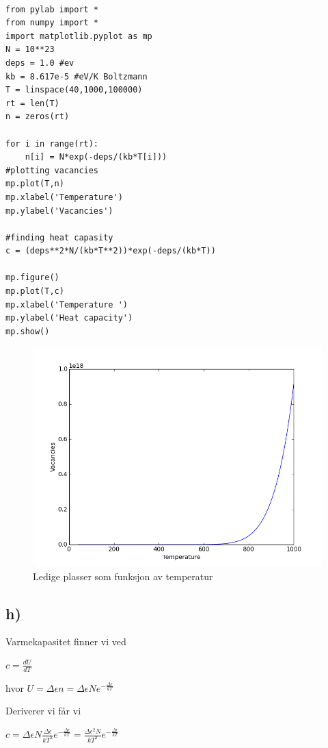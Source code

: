 \documentclass[12pt]{article}
\begin{document}
\begin{lstlisting}

from pylab import *
from numpy import *
import matplotlib.pyplot as mp
N = 10**23
deps = 1.0 #ev
kb = 8.617e-5 #eV/K Boltzmann
T = linspace(40,1000,100000)
rt = len(T)
n = zeros(rt)

for i in range(rt):
    n[i] = N*exp(-deps/(kb*T[i]))
#plotting vacancies 
mp.plot(T,n)
mp.xlabel('Temperature')
mp.ylabel('Vacancies')

#finding heat capasity
c = (deps**2*N/(kb*T**2))*exp(-deps/(kb*T))

mp.figure()
mp.plot(T,c)
mp.xlabel('Temperature ')
mp.ylabel('Heat capacity')
mp.show()

\end{lstlisting}


\begin{figure}[hb!]
\includegraphics[width = \textwidth]{vacancies}
\caption{Ledige plasser som funksjon av temperatur}
\label{temp}
\end{figure}

\subsection*{h)}

Varmekapasitet finner vi ved 

$c = \frac{dU}{dT}$

hvor $U = \Delta \epsilon n = \Delta \epsilon Ne^{-\frac{\Delta \epsilon}{kT}}$

Deriverer vi får vi 

$c = \Delta \epsilon N \frac{\Delta \epsilon}{kT^2}e^{-\frac{\Delta \epsilon}{kT}} = \frac{\Delta \epsilon^2N}{kT^2}e^{-\frac{\Delta \epsilon}{kT}}$ 
\end{document}
